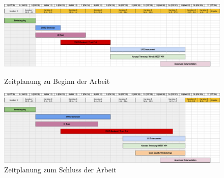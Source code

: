 \begin{figure}

	\begin{minipage}[t]{0.9\textwidth}
		\includegraphics[width=\linewidth]{images/zeitplanung/iteration_1}
		\caption{Zeitplanung zu Beginn der Arbeit}
		\label{zeitanalyse:vorher}
	\end{minipage}

	\vspace{2cm}

	\begin{minipage}[t]{0.9\textwidth}
		\includegraphics[width=\linewidth]{images/zeitplanung/iteration_8}
		\caption{Zeitplanung zum Schluss der Arbeit}
		\label{zeitanalyse:nachher}
	\end{minipage}

\end{figure}
